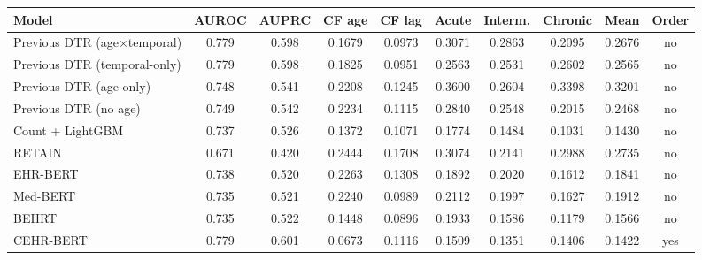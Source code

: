 \begin{tabular}{lccccccccc}
\toprule
Model & AUROC & AUPRC & CF age & CF lag & Acute & Interm. & Chronic & Mean & Order \\
\midrule
Previous DTR (age$\times$temporal) & 0.779 & 0.598 & 0.1679 & 0.0973 & 0.3071 & 0.2863 & 0.2095 & 0.2676 & no \\
Previous DTR (temporal-only) & 0.779 & 0.598 & 0.1825 & 0.0951 & 0.2563 & 0.2531 & 0.2602 & 0.2565 & no \\
Previous DTR (age-only) & 0.748 & 0.541 & 0.2208 & 0.1245 & 0.3600 & 0.2604 & 0.3398 & 0.3201 & no \\
Previous DTR (no age) & 0.749 & 0.542 & 0.2234 & 0.1115 & 0.2840 & 0.2548 & 0.2015 & 0.2468 & no \\
Count + LightGBM & 0.737 & 0.526 & 0.1372 & 0.1071 & 0.1774 & 0.1484 & 0.1031 & 0.1430 & no \\
RETAIN & 0.671 & 0.420 & 0.2444 & 0.1708 & 0.3074 & 0.2141 & 0.2988 & 0.2735 & no \\
EHR-BERT & 0.738 & 0.520 & 0.2263 & 0.1308 & 0.1892 & 0.2020 & 0.1612 & 0.1841 & no \\
Med-BERT & 0.735 & 0.521 & 0.2240 & 0.0989 & 0.2112 & 0.1997 & 0.1627 & 0.1912 & no \\
BEHRT & 0.735 & 0.522 & 0.1448 & 0.0896 & 0.1933 & 0.1586 & 0.1179 & 0.1566 & no \\
CEHR-BERT & 0.779 & 0.601 & 0.0673 & 0.1116 & 0.1509 & 0.1351 & 0.1406 & 0.1422 & yes \\
\bottomrule
\end{tabular}
